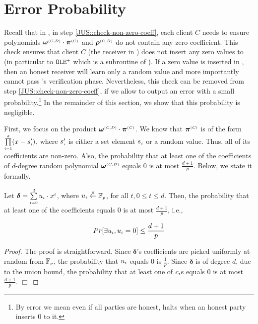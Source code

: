 

\section{Error Probability}\label{sec::error-prob}


Recall that in \fpsi, in step \ref{JUS::check-non-zero-coeff},  each client $C$ needs to ensure polynomials $\bm\omega^{\scriptscriptstyle (C,D)}\cdot \bm\pi^{\scriptscriptstyle  {  {(C)}}}$ and  $\bm\rho^{\scriptscriptstyle (C,D)}$ do not contain any zero coefficient. This check ensures that client $C$ (the receiver in \vopr) does not insert any zero values to  \vopr (in particular to $\mathtt{OLE}^{\scriptscriptstyle +}$ which is a subroutine of \vopr). If a zero value is inserted in \vopr, then an honest receiver will learn only a random value and more importantly cannot pass \vopr's verification phase. 
%
Nevertheless,  this check can be removed from step \ref{JUS::check-non-zero-coeff}, if we allow \fpsi to output an error with a small probability.\footnote{By error we mean even if all parties are honest,  \vopr halts when an honest party inserts $0$ to it.} In the remainder of this section, we show that this probability is negligible. 


First, we focus on the product $\bm\omega^{\scriptscriptstyle (C,D)}\cdot \bm\pi^{\scriptscriptstyle  {  {(C)}}}$. We know that $\bm\pi^{\scriptscriptstyle  {  {(C)}}}$ is of the form $\prod\limits^{\scriptscriptstyle d}_{\scriptscriptstyle i=1} (x-s'_{\scriptscriptstyle i})$, where $s'_{\scriptscriptstyle i}$ is either a set element $s_{\scriptscriptstyle i}$ or a random value.  Thus, all of its coefficients are non-zero. Also, the probability that at least one of the coefficients  of $d$-degree random polynomial $\bm\omega^{\scriptscriptstyle (C,D)}$ equals $0$ is at most $\frac{d+1}{p}$.  Below, we state it formally.


\begin{theorem}\label{theorem::zero-coeff-in-ran-poly}
Let $\bm\delta=\sum\limits_{\scriptscriptstyle t=0}^{\scriptscriptstyle d}u_{\scriptscriptstyle  t} \cdot x^{\scriptscriptstyle t}$, where  $u_{\scriptscriptstyle  t}\stackrel{\scriptscriptstyle\$}\leftarrow\mathbb{F}_{\scriptscriptstyle p}$, for all $t, 0\leq t\leq d$. Then, the probability that at least one of the coefficients equals $0$ is at most $\frac{d+1}{p}$, i.e., 

$$Pr[\exists u_{\scriptscriptstyle t}, u_{\scriptscriptstyle t}=0]\leq \frac{d+1}{p}$$
\end{theorem}


\begin{proof}
The proof is straightforward. Since $\bm\delta$'s coefficients are picked uniformly at random from  $\mathbb{F}_{\scriptscriptstyle p}$, the probability that $u_{\scriptscriptstyle t}$ equals $0$ is $\frac{1}{p}$. Since $\bm\delta$ is of degree $d$, due to the union bound, the probability that at least one of $c_{\scriptscriptstyle t}$s equals $0$ is at most $\frac{d+1}{p}$. 
 \hfill\(\Box\)\end{proof}




